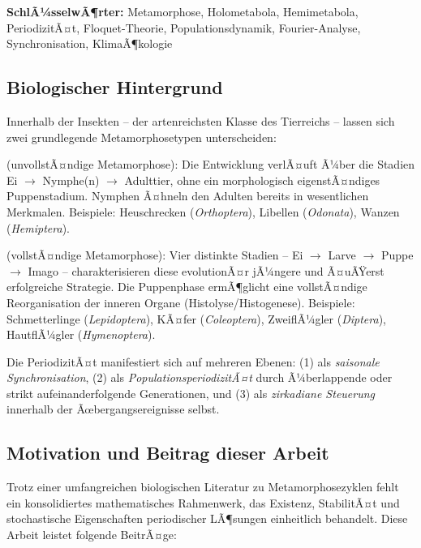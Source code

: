 ﻿\documentclass[12pt, a4paper]{article}
\theoremstyle{definition}
\begin{document}
\textbf{SchlÃ¼sselwÃ¶rter:} Metamorphose, Holometabola, Hemimetabola, PeriodizitÃ¤t,
Floquet-Theorie, Populationsdynamik, Fourier-Analyse, Synchronisation, KlimaÃ¶kologie

\subsection{Biologischer Hintergrund}

Innerhalb der Insekten -- der artenreichsten Klasse des Tierreichs -- lassen
sich zwei grundlegende Metamorphosetypen unterscheiden:

\begin{description}[leftmargin=2cm, labelwidth=1.8cm]
  \item[\textbf{Hemimetabolie}] (unvollstÃ¤ndige Metamorphose): Die Entwicklung
    verlÃ¤uft Ã¼ber die Stadien Ei $\to$ Nymphe(n) $\to$ Adulttier, ohne ein
    morphologisch eigenstÃ¤ndiges Puppenstadium. Nymphen Ã¤hneln den Adulten bereits
    in wesentlichen Merkmalen. Beispiele: Heuschrecken (\emph{Orthoptera}),
    Libellen (\emph{Odonata}), Wanzen (\emph{Hemiptera}).

  \item[\textbf{Holometabolie}] (vollstÃ¤ndige Metamorphose): Vier distinkte Stadien
    -- Ei $\to$ Larve $\to$ Puppe $\to$ Imago -- charakterisieren diese evolutionÃ¤r
    jÃ¼ngere und Ã¤uÃŸerst erfolgreiche Strategie. Die Puppenphase ermÃ¶glicht eine
    vollstÃ¤ndige Reorganisation der inneren Organe (Histolyse/Histogenese).
    Beispiele: Schmetterlinge (\emph{Lepidoptera}), KÃ¤fer (\emph{Coleoptera}),
    ZweiflÃ¼gler (\emph{Diptera}), HautflÃ¼gler (\emph{Hymenoptera}).
\end{description}

Die PeriodizitÃ¤t manifestiert sich auf mehreren Ebenen: (1) als \emph{saisonale
Synchronisation}, (2) als \emph{PopulationsperiodizitÃ¤t} durch Ã¼berlappende oder
strikt aufeinanderfolgende Generationen, und (3) als \emph{zirkadiane Steuerung}
innerhalb der Ãœbergangsereignisse selbst.

\subsection{Motivation und Beitrag dieser Arbeit}

Trotz einer umfangreichen biologischen Literatur zu Metamorphosezyklen fehlt ein
konsolidiertes mathematisches Rahmenwerk, das Existenz, StabilitÃ¤t und stochastische
Eigenschaften periodischer LÃ¶sungen einheitlich behandelt. Diese Arbeit leistet
folgende BeitrÃ¤ge:
\end{document}
